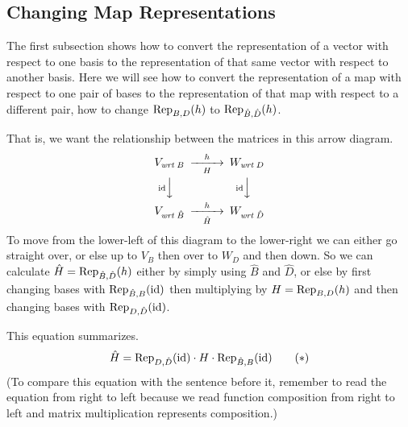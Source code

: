 \subsection{Changing Map Representations}
The first subsection shows how to convert the representation
of a vector with respect to one basis to the representation of that
same vector with respect to another basis.
Here we will see how to
convert the representation of a map  with
respect to one pair of bases  to the representation of that
map with respect to a different pair, how to change
$\rep{h}{B,D}$ to $\rep{h}{\hat{B},\hat{D}}$.

That is, we want the relationship between the matrices in this 
arrow diagram.
\begin{equation*}
  \begin{CD}
    V_\wrt{B}                   @>h>H>        W_\wrt{D}       \\
    @V{\text{\scriptsize$\identity$}} VV                @V{\text{\scriptsize$\identity$}} VV \\
    V_\wrt{\hat{B}}             @>h>\hat{H}>  W_\wrt{\hat{D}}
  \end{CD}
\end{equation*}
To move from the lower-left of this diagram 
to the lower-right we can either go straight over, or
else up to $V_B$ then over to $W_D$ and then down.
So 
we can calculate $\hat{H}=\rep{h}{\hat{B},\hat{D}}$ 
either by simply using $\hat{B}$ and $\hat{D}$,
or else by first changing bases with $\rep{\identity}{\hat{B},B}$ 
then multiplying by \( H=\rep{h}{B,D} \)
and then changing bases with $\rep{\identity}{D,\hat{D}}$.

This equation summarizes.
\begin{equation*}
   \hat{H}=
   \rep{\identity}{D,\hat{D}}\cdot H\cdot \rep{\identity}{\hat{B},B}
\tag*{\text{($*$})}\end{equation*}
(To compare this equation with the sentence before it, remember to read the
equation from right to left because we read
function composition from right to left and matrix multiplication 
represents composition.)

